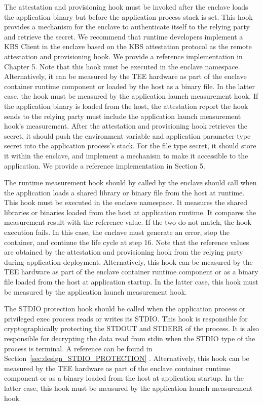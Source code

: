   The attestation and provisioning hook must be invoked after the enclave loads the application binary but before the application process stack is set. This hook provides a mechanism for the enclave to authenticate itself to the relying party and 
  retrieve the secret. We recommend that runtime developers implement a KBS Client in the enclave based on the KBS attestation protocol as the remote attestation and provisioning hook. We provide a reference implementation in Chapter 5. Note that 
  this hook must be executed in the enclave namespace. Alternatively, it can be measured by the TEE hardware as part of the enclave container runtime component or loaded by the host as a binary file. In the latter case, the hook must be measured 
  by the application launch measurement hook. If the application binary is loaded from the host, the attestation report the hook sends to the relying party must include the application launch measurement hook's measurement. After the attestation 
  and provisioning hook retrieves the secret, it should push the environment variable and application parameter type secret into the application process's stack. For the file type secret, it should store it within the enclave, and implement a 
  mechanism to make it accessible to the application. We provide a reference implementation in Section 5.

  The runtime measurement hook should by called by the enclave should call  when the application loads a shared library or binary file from the host at runtime. This hook must be executed in the enclave namespace. It measures the shared libraries or 
  binaries loaded from the host at application runtime. It compares the measurement result with the reference value. If the two do not match, the hook execution fails. In this case, the enclave must generate an error, stop the container, and 
  continue the life cycle at step 16. Note that the reference values are obtained by the attestation and provisioning hook from the relying party during application deployment. Alternatively, this hook can be measured by the TEE hardware as part 
  of the enclave container runtime component or as a binary file loaded from the host at application startup. In the latter case, this hook must be measured by the application launch measurement hook.
  

  The STDIO protection hook should be called when the application process or privileged exec process reads or writes its STDIO. This hook is responsible for cryptographically protecting the STDOUT and STDERR of the process. It is also responsible 
  for decrypting the data read from stdin when the STDIO type of the process is terminal. A reference can be found in Section~\ref*{sec:design_STDIO_PROTECTION} . Alternatively, this hook can be measured by the TEE hardware as part of the enclave container runtime 
  component or as a binary loaded from the host at application startup. In the latter case, this hook must be measured by the application launch measurement hook.
  
